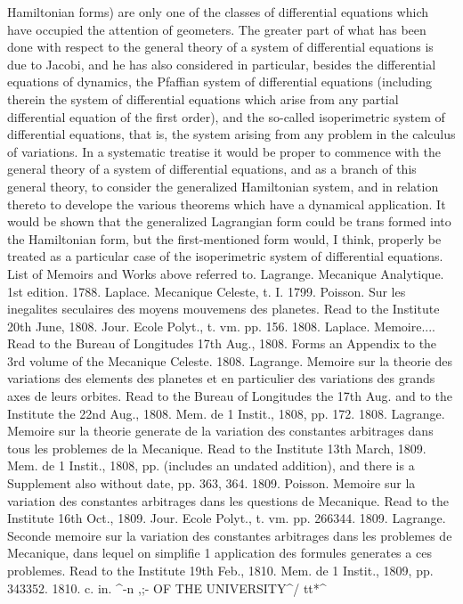 \documentclass[11pt,a4paper]{book}
\begin{document}
Hamiltonian
forms)
are
only
one
of
the
classes
of
differential
equations
which
have
occupied
the
attention
of
geometers.
The
greater
part
of what
has
been
done
with
respect
to
the
general
theory
of
a
system
of
differential
equations
is
due
to
Jacobi,
and
he
has
also
considered
in
particular, besides
the
differential
equations
of dynamics,
the
Pfaffian system
of differential
equations (including
therein
the
system
of
differential
equations
which
arise
from
any
partial
differential
equation
of
the
first
order),
and
the
so-called
isoperimetric
system
of
differential
equations,
that
is,
the
system
arising
from
any problem
in
the
calculus
of
variations.
In
a
systematic
treatise
it
would be
proper
to commence with
the
general
theory
of
a system
of
differential
equations, and
as
a
branch
of
this
general
theory,
to
consider
the
generalized
Hamiltonian
system,
and
in
relation
thereto
to
develope
the
various
theorems
which
have
a
dynamical
application.
It
would
be
shown
that
the generalized
Lagrangian
form
could be
trans
formed
into
the
Hamiltonian
form,
but
the
first-mentioned
form
would,
I
think,
properly
be
treated
as
a
particular
case
of
the
isoperimetric
system
of
differential
equations.
List of Memoirs and
Works above referred
to.
Lagrange.
Mecanique Analytique.
1st
edition.
1788.
Laplace.
Mecanique
Celeste,
t.
I.
1799.
Poisson.
Sur
les
inegalites
seculaires
des
moyens
mouvemens
des
planetes.
Read
to
the
Institute 20th June,
1808.
Jour.
Ecole
Polyt.,
t. vm.
pp. 156.
1808.
Laplace.
Memoire....
Read
to
the
Bureau
of
Longitudes
17th
Aug.,
1808.
Forms
an Appendix
to
the 3rd volume
of the Mecanique
Celeste.
1808.
Lagrange.
Memoire
sur
la
theorie
des
variations
des
elements
des
planetes
et
en
particulier
des
variations
des
grands
axes
de
leurs
orbites.
Read
to
the
Bureau
of
Longitudes
the
17th
Aug.
and
to
the
Institute
the
22nd
Aug.,
1808.
Mem.
de
1 Instit.,
1808, pp. 172.
1808.
Lagrange.
Memoire
sur
la
theorie
generate
de
la
variation
des
constantes arbitrages
dans
tous
les
problemes
de
la Mecanique.
Read
to
the
Institute
13th
March,
1809.
Mem.
de
1 Instit.,
1808,
pp.
(includes
an
undated
addition),
and
there
is a Supplement
also without
date,
pp.
363, 364.
1809.
Poisson.
Memoire
sur
la
variation
des
constantes
arbitrages
dans
les
questions
de
Mecanique.
Read
to
the
Institute
16th
Oct.,
1809.
Jour.
Ecole
Polyt.,
t. vm.
pp. 266344.
1809.
Lagrange.
Seconde
memoire
sur
la
variation
des
constantes
arbitrages
dans
les
problemes de Mecanique, dans
lequel on
simplifie
1 application des
formules generates
a
ces
problemes.
Read
to
the
Institute
19th
Feb.,
1810.
Mem.
de
1 Instit.,
1809,
pp. 343352.
1810.
c.
in.
^-^^. ,;-
OF THE
UNIVERSITY^/
tt*^
\end{document}
